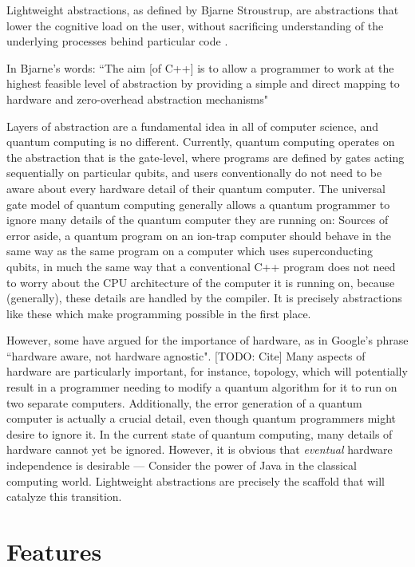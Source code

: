\documentclass[journal]{article}
\begin{document}
Lightweight abstractions, as defined by Bjarne Stroustrup, are abstractions that lower the cognitive load on the user, without sacrificing understanding of the underlying processes behind particular code \cite{stroustrup}.

In Bjarne's words:
``The aim [of C++] is to allow a programmer to work at the highest feasible level of abstraction by providing a simple and direct mapping to hardware and zero-overhead abstraction mechanisms"

Layers of abstraction are a fundamental idea in all of computer science, and quantum computing is no different.
Currently, quantum computing operates on the abstraction that is the gate-level, where programs are defined by gates acting sequentially on particular qubits, and users conventionally do not need to be aware about every hardware detail of their quantum computer.
The universal gate model of quantum computing generally allows a quantum programmer to ignore many details of the quantum computer they are running on: Sources of error aside, a quantum program on an ion-trap computer should behave in the same way as the same program on a computer which uses superconducting qubits, in much the same way that a conventional C++ program does not need to worry about the CPU architecture of the computer it is running on, because (generally), these details are
handled by the compiler.
It is precisely abstractions like these which make programming possible in the first place.

However, some have argued for the importance of hardware, as in Google's phrase ``hardware aware, not hardware agnostic". [TODO: Cite]
Many aspects of hardware are particularly important, for instance, topology, which will potentially result in a programmer needing to modify a quantum algorithm for it to run on two separate computers.
Additionally, the error generation of a quantum computer is actually a crucial detail, even though quantum programmers might desire to ignore it.
In the current state of quantum computing, many details of hardware cannot yet be ignored. 
However, it is obvious that \emph{eventual} hardware independence is desirable --- Consider the power of Java in the classical computing world. Lightweight abstractions are precisely the scaffold that will catalyze this transition.

\section{Features}
\end{document}
